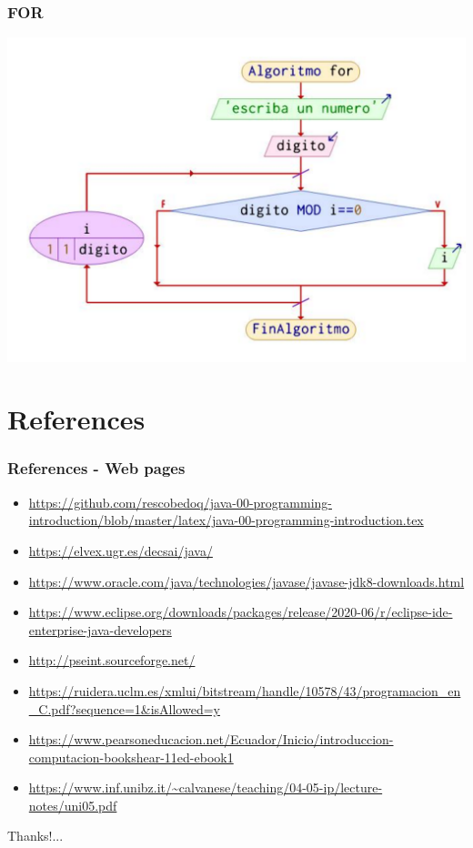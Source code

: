 \documentclass[11pt]{beamer}
\begin{document}
\begin{frame}
\frametitle{FOR}
\begin{center}
\includegraphics[scale=0.29]{figuras/for.pdf}
\end{center}
\end{frame}

\section{References}
\begin{frame}
\frametitle{References - Web pages}
\begin{itemize}
\item \url{https://github.com/rescobedoq/java-00-programming-introduction/blob/master/latex/java-00-programming-introduction.tex}
\item \url{https://elvex.ugr.es/decsai/java/}
\item \url{https://www.oracle.com/java/technologies/javase/javase-jdk8-downloads.html}
\item \url{https://www.eclipse.org/downloads/packages/release/2020-06/r/eclipse-ide-enterprise-java-developers}
\item \url{http://pseint.sourceforge.net/}
\item \url{https://ruidera.uclm.es/xmlui/bitstream/handle/10578/43/programacion_en_C.pdf?sequence=1&isAllowed=y}
\item \url{https://www.pearsoneducacion.net/Ecuador/Inicio/introduccion-computacion-bookshear-11ed-ebook1}
\item \url{https://www.inf.unibz.it/~calvanese/teaching/04-05-ip/lecture-notes/uni05.pdf}
\end{itemize}
\end{frame}


\begin{frame}
\begin{center}
Thanks!...

\end{center}
\end{frame}
\end{document}

